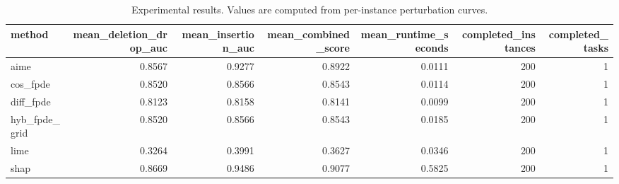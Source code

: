 \begin{table}[t]
\caption{Experimental results. Values are computed from per-instance perturbation curves.}
\label{tab:main_results_computed}
\centering
\begin{tabular}{lrrrrrr}
\toprule
method & mean\_deletion\_drop\_auc & mean\_insertion\_auc & mean\_combined\_score & mean\_runtime\_seconds & completed\_instances & completed\_tasks \\
\midrule
aime & 0.8567 & 0.9277 & 0.8922 & 0.0111 & 200 & 1 \\
cos\_fpde & 0.8520 & 0.8566 & 0.8543 & 0.0114 & 200 & 1 \\
diff\_fpde & 0.8123 & 0.8158 & 0.8141 & 0.0099 & 200 & 1 \\
hyb\_fpde\_grid & 0.8520 & 0.8566 & 0.8543 & 0.0185 & 200 & 1 \\
lime & 0.3264 & 0.3991 & 0.3627 & 0.0346 & 200 & 1 \\
shap & 0.8669 & 0.9486 & 0.9077 & 0.5825 & 200 & 1 \\
\bottomrule
\end{tabular}

\end{table}
